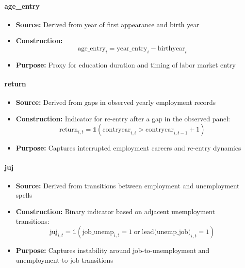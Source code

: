 \documentclass{article}
\begin{document}
\paragraph{age\_entry}
\begin{itemize}
    \item \textbf{Source:} Derived from year of first appearance and birth year
    \item \textbf{Construction:}
    \begin{equation}
        \text{age\_entry}_i = \text{year\_entry}_i - \text{birthyear}_i
    \end{equation}
    \item \textbf{Purpose:} Proxy for education duration and timing of labor market entry
\end{itemize}

\paragraph{return}
\begin{itemize}
    \item \textbf{Source:} Derived from gaps in observed yearly employment records
    \item \textbf{Construction:} Indicator for re-entry after a gap in the observed panel:
    \begin{equation}
        \text{return}_{i,t} = \mathbb{1}(\text{contryear}_{i,t} > \text{contryear}_{i,t-1} + 1)
    \end{equation}
    \item \textbf{Purpose:} Captures interrupted employment careers and re-entry dynamics
\end{itemize}

\paragraph{juj}
\begin{itemize}
    \item \textbf{Source:} Derived from transitions between employment and unemployment spells
    \item \textbf{Construction:} Binary indicator based on adjacent unemployment transitions:
    \begin{equation}
        \text{juj}_{i,t} = \mathbb{1}(\text{job\_unemp}_{i,t}=1 \; \text{or} \; \text{lead(unemp\_job)}_{i,t}=1)
    \end{equation}
    \item \textbf{Purpose:} Captures instability around job-to-unemployment and unemployment-to-job transitions
\end{itemize}
\end{document}
